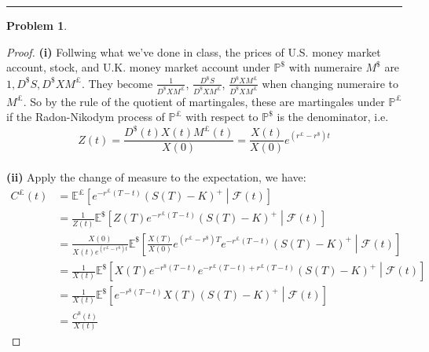 \documentclass[a4paper, 10pt]{article}
\theoremstyle{definition}
\newtheorem{problem}{Problem}
\theoremstyle{hSol}
\begin{document}
\noindent\rule{16cm}{0.4pt}
\begin{problem} 
\end{problem}
\begin{proof} \textbf{(i)} Follwing what we've done in class, the prices of U.S. money market account, stock, and U.K. money market account under $\mathbb{P}^{\$}$ with numeraire $M^{\$}$ are $1, D^{\$}S, D^{\$} XM^{\pounds}$. They become $\frac{1}{D^{\$} XM^{\pounds}}$, $\frac{D^{\$}S}{D^{\$} XM^{\pounds}}$, $\frac{D^{\$} XM^{\pounds}}{D^{\$} XM^{\pounds}}$ when changing numeraire to $M^{\pounds}$. So by the rule of the quotient of martingales, these are martingales under $\mathbb{P}^{\pounds}$ if the Radon-Nikodym process of $\mathbb{P}^{\pounds}$ with respect to $\mathbb{P}^{\$}$ is the denominator, i.e.
\begin{equation}
  Z(t) = \frac{D^{\$}(t) X(t)M^{\pounds}(t)}{X(0)} = \frac{X(t)}{X(0)}e^{(r^{\pounds} - r^{\$})t}
\end{equation}
~\\
\textbf{(ii)} Apply the change of measure to the expectation, we have:
\begin{equation}
  \begin{split}
    C^{\pounds}(t) &= \mathbb{E}^{\pounds}\left[e^{-r^{\pounds}(T-t)}(S(T)-K)^+\middle|\mathcal{F}(t)\right] \\
    &= \frac{1}{Z(t)}\mathbb{E}^{\$}\left[Z(T)e^{-r^{\pounds}(T-t)}(S(T)-K)^+\middle|\mathcal{F}(t)\right]\\
    &= \frac{X(0)}{X(t)e^{(r^{\pounds} - r^{\$})t}}\mathbb{E}^{\$}\left[\frac{X(T)}{X(0)}e^{(r^{\pounds} - r^{\$})T}e^{-r^{\pounds}(T-t)}(S(T)-K)^+\middle|\mathcal{F}(t)\right]\\
    &= \frac{1}{X(t)}\mathbb{E}^{\$}\left[X(T)e^{ - r^{\$}(T-t)}e^{-r^{\pounds}(T-t) + r^{\pounds}(T-t)}(S(T)-K)^+\middle|\mathcal{F}(t)\right]\\
     &= \frac{1}{X(t)}\mathbb{E}^{\$}\left[e^{ - r^{\$}(T-t)}X(T)(S(T)-K)^+\middle|\mathcal{F}(t)\right]\\
     &= \frac{C^{\$}(t)}{X(t)}
  \end{split}
\end{equation}
\end{proof}
\end{document}
